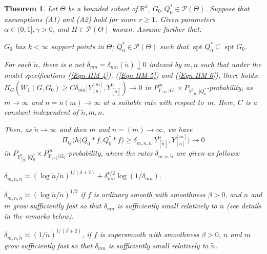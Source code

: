\documentclass[MSNbibl,number,citesort]{arxbj}
\newcommand{\eqref}[1]{(\ref{#1})}
\newtheorem{theorem}{Theorem}[section]
\newcommand{\real}{\mathbb{R}}
\newcommand{\Pcal}{\mathscr{P}}
\newcommand{\supp}{\operatorname{spt}}
\newcommand{\PGz}{P_{Y_{[n]}|G_0}}
\newcommand{\YYn}{Y_{[n]}}
\newcommand{\delmn}{\delta_{mn}}
\newcommand{\nn}{\tilde{n}}
\begin{document}
%
\begin{theorem}
\label{Thm-main-2}
Let $\Theta$ be a bounded subset of $\real^d$, $G_0,Q_0^* \in\Pcal
(\Theta)$.
Suppose that assumptions \textup{(A1)} and \textup{(A2)} hold for some $r \geq1$.\vadjust{\goodbreak}
Given parameters $\alpha\in(0,1], \gamma> 0$, and
$H\in\Pcal(\Theta)$ known. Assume further that:
%
\begin{longlist}[(a)]
%
\item[(a)] $G_0$ has $k < \infty$ support points in $\Theta$;
$Q_0^*\in\Pcal(\Theta)$ such that $\supp Q_0^*\subseteq
\supp G_0$.
%
\item[(b)] For each $\nn$, there is a net $\delmn= \delmn(\nn)
\downarrow0$
indexed by $m,n$ such that under
the model specifications \eqref{Eqn-HM-4}, \eqref{Eqn-HM-5} and
\eqref
{Eqn-HM-6},
there holds:
%
$\Pi_G (W_1(G,G_0) \geq
C \delmn| \YYn^{[m]}, Y_{[\nn]}^0)
\longrightarrow0$
in $\PGz^m\times P_{Y_{[\nn]}^{0}|Q_0^*}$-probability,
as $m \rightarrow\infty$ and $n=n(m) \rightarrow\infty$ at a suitable
rate with respect to~$m$.
Here, $C$ is a constant independent of $\nn, m, n$.
\end{longlist}
%
Then, as $\nn\rightarrow\infty$ and then $m$ and $n=(m)\rightarrow
\infty$, we have
%
\[
\Pi_Q \bigl( h\bigl(Q_0*f,Q_0^**f
\bigr) \geq \delta_{m,n,\nn} |Y_{[\nn
]}^0,
\YYn^{[m]} \bigr) \longrightarrow0
\]
%
in $P_{Y_{[\nn]}^0|Q_0^*}\times\PGz^m$-probability, where
the rates $\delta_{m,n,\nn}$ are given as follows:
%
\begin{longlist}[(iii)]
%
\item[(i)] $\delta_{m,n,\nn} \asymp(\log\nn/\nn
)^{1/(d+2)}+\delmn
^{r/2}\log(1/\delmn)$.
%
\item[(ii)] $\delta_{m,n, \nn} \asymp(\log\nn/\nn)^{1/2}$ if $f$ is
ordinary smooth
with smoothness $\beta>0$, and $n$ and $m$ grow sufficiently fast so that
$\delmn$ is sufficiently small relatively to $\nn$ (see details in the
remarks below).
%
\item[(iii)] $\delta_{m,n,\nn} \asymp(1/\nn)^{1/(\beta+2)}$, if
$f$ is supersmooth with smoothness $\beta> 0$, $n$ and $m$ grow
sufficiently fast so that $\delmn$ is sufficiently small relatively to
$\nn$.\vadjust{\goodbreak}
\end{longlist}
%
\end{theorem}
\end{document}
